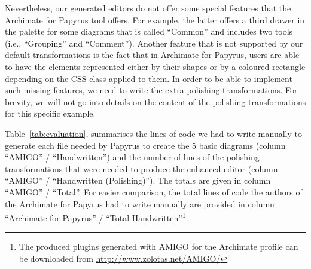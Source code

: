 Nevertheless, our generated editors do 
not offer some special features that the Archimate for Papyrus tool offers. For 
example, the latter offers a third drawer in the palette for some diagrams that 
is called ``Common'' and includes two tools (i.e., ``Grouping'' and 
``Comment''). Another feature that is not supported by our default 
transformations is the fact that in Archimate for Papyrus, users are able to 
have the elements represented either by their shapes or by a coloured rectangle 
depending on the CSS class applied to them. In order to be able to implement 
such missing features, we need to write the extra polishing transformations. 
For brevity, we will not go into details on the content of the polishing 
transformations for this specific example.

Table~\ref{tab:evaluation}, summarises the lines of code we had to write manually to generate each file needed by Papyrus to create the 5 basic diagrams (column ``AMIGO'' / ``Handwritten'') and the number of lines of the polishing transformations that were needed to produce the enhanced editor (column ``AMIGO'' / ``Handwritten (Polishing)''). The totals are given in column ``AMIGO'' / ``Total''. For easier comparison, the total lines of code the authors of the Archimate for Papyrus had to write manually are provided in column ``Archimate for Papyrus'' / ``Total Handwritten''\footnote{The produced plugins generated with AMIGO for the Archimate profile can be downloaded from \url{http://www.zolotas.net/AMIGO/}}.

